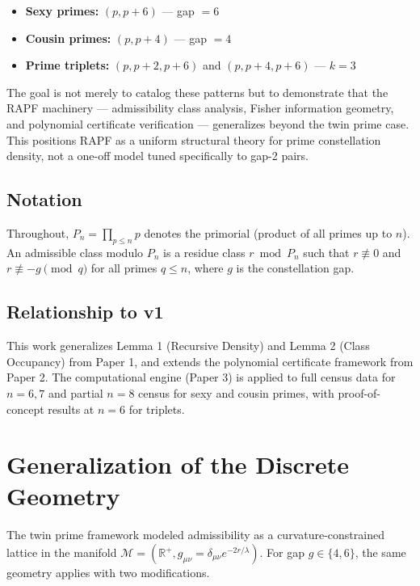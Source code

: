 \documentclass[10pt,a4paper]{article}
\theoremstyle{remark}
\begin{document}
\begin{itemize}
    \item \textbf{Sexy primes:} $(p, p+6)$ — gap $= 6$
    \item \textbf{Cousin primes:} $(p, p+4)$ — gap $= 4$
    \item \textbf{Prime triplets:} $(p, p+2, p+6)$ and $(p, p+4, p+6)$ — $k = 3$
\end{itemize}

The goal is not merely to catalog these patterns but to demonstrate that the RAPF
machinery — admissibility class analysis, Fisher information geometry, and polynomial
certificate verification — generalizes beyond the twin prime case. This positions RAPF
as a uniform structural theory for prime constellation density, not a one-off model
tuned specifically to gap-2 pairs.

\subsection*{Notation}
Throughout, $P_n = \prod_{p \le n} p$ denotes the primorial (product of all primes up to $n$).
An admissible class modulo $P_n$ is a residue class $r \bmod P_n$ such that $r \not\equiv 0$
and $r \not\equiv -g \pmod{q}$ for all primes $q \le n$, where $g$ is the constellation gap.

\subsection*{Relationship to v1}
This work generalizes Lemma 1 (Recursive Density) and Lemma 2 (Class Occupancy) from
Paper 1, and extends the polynomial certificate framework from Paper 2. The computational
engine (Paper 3) is applied to full census data for $n = 6, 7$ and partial $n = 8$ census
for sexy and cousin primes, with proof-of-concept results at $n = 6$ for triplets.

\section{Generalization of the Discrete Geometry}

The twin prime framework modeled admissibility as a curvature-constrained lattice in
the manifold $\mathcal{M} = (\mathbb{R}^+, g_{\mu\nu} = \delta_{\mu\nu} e^{-2r/\lambda})$.
For gap $g \in \{4, 6\}$, the same geometry applies with two modifications.
\end{document}
